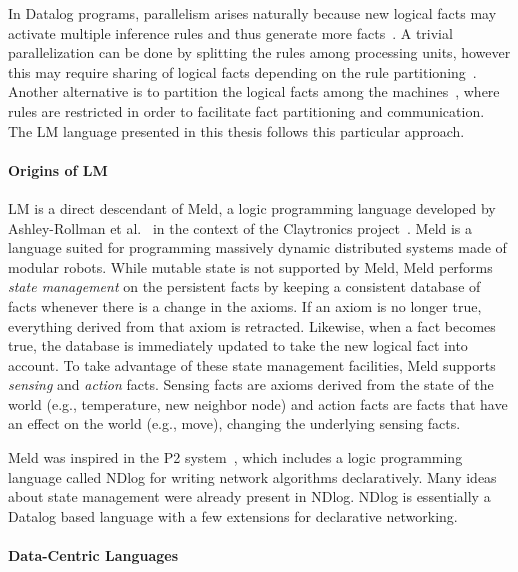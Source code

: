 In Datalog programs, parallelism arises naturally because new logical facts may
activate multiple inference rules and thus generate more
facts~\cite{Ganguly:1990:FPP:93597.98724,Seib:1991:PDP:113413.113435,Wolfson:1988:DPL:971701.50242}.
A trivial parallelization can be done by splitting the rules among processing
units, however this may require sharing of logical facts depending on the rule
partitioning~\cite{Wolfson:1988:DPL:971701.50242}. Another alternative is to
partition the logical facts among the
machines~\cite{183073,Loo-condie-garofalakis-p2}, where rules are restricted in
order to facilitate fact partitioning and communication. The LM language
presented in this thesis follows this particular approach.

\paragraph{Origins of LM}

LM is a direct descendant of Meld, a logic programming language developed by
Ashley-Rollman et
al.~\cite{ashley-rollman-iclp09,ashley-rollman-derosa-iros07wksp} in the context
of the Claytronics project~\cite{goldstein-computer05}. Meld is a language
suited for programming massively dynamic distributed systems made of modular
robots. While mutable state is not supported by Meld, Meld performs \emph{state
management} on the persistent facts by keeping a consistent database of facts
whenever there is a change in the axioms. If an axiom is no longer true,
everything derived from that axiom is retracted. Likewise, when a fact becomes
true, the database is immediately updated to take the new logical fact into
account. To take advantage of these state management facilities, Meld supports
\emph{sensing} and \emph{action} facts. Sensing facts are axioms derived from
the state of the world (e.g., temperature, new neighbor node) and action facts
are facts that have an effect on the world (e.g., move), changing the underlying
sensing facts.

Meld was inspired in the P2 system~\cite{Loo-condie-garofalakis-p2}, which
includes a logic programming language called NDlog for writing network
algorithms declaratively. Many ideas about state management were already present
in NDlog.  NDlog is essentially a Datalog based language with a few extensions
for declarative networking.

\paragraph{Data-Centric Languages}

